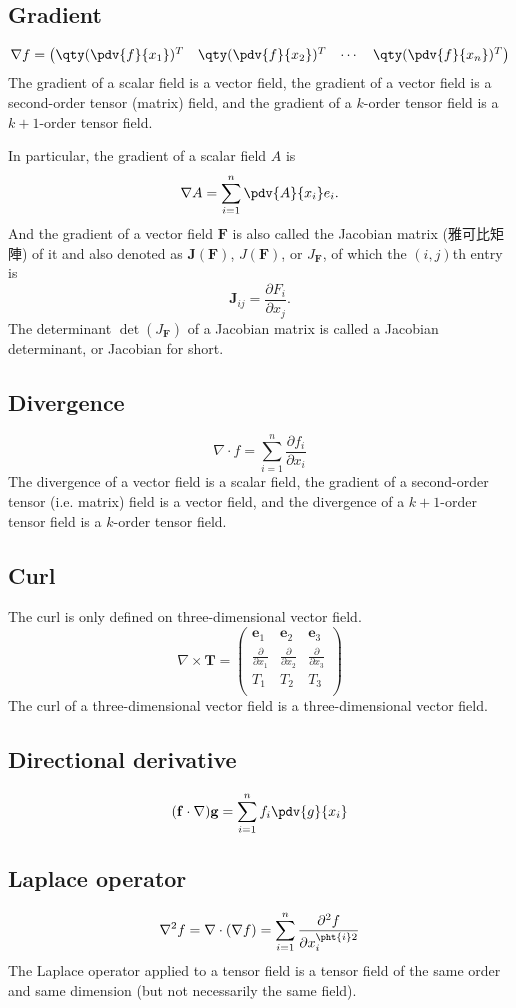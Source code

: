 \documentclass[a4paper,12pt]{report}
\begin{document}
\subsection{Gradient}
\[
\nabla f = \begin{pmatrix}\qty(\pdv{f}{x_1})^T & \qty(\pdv{f}{x_2})^T & \cdots & \qty(\pdv{f}{x_n})^T\end{pmatrix}
\]
The gradient of a scalar field is a vector field, the gradient of a vector field is a second-order tensor (matrix) field, and the gradient of a $k$-order tensor field is a $k+1$-order tensor field. 

In particular, the gradient of a scalar field $A$ is
\[
\nabla A = \sum_{i=1}^n \pdv{A}{x_i}e_i.
\]
And the gradient of a vector field $\mathbf{F}$ is also called the Jacobian matrix (雅可比矩陣) of it and also denoted as $\mathbf{J}(\mathbf{F})$, $J(\mathbf{F})$, or $J_{\mathbf{F}}$, of which the $( i,j )$th entry is
\[\mathbf{J}_{ij}=\frac{\partial F_i}{\partial x_j}.\]
The determinant $\det\left(J_{\mathbf{F}}\right)$ of a Jacobian matrix is called a Jacobian determinant, or Jacobian for short.
\subsection{Divergence}
\[
\nabla \cdot f = \sum_{i=1}^n\frac{\partial f_i}{\partial x_i}
\]
The divergence of a vector field is a scalar field, the gradient of a second-order tensor (i.e. matrix) field is a vector field, and the divergence of a $k+1$-order tensor field is a $k$-order tensor field.
\subsection{Curl}
The curl is only defined on three-dimensional vector field.
\[
\nabla \times \mathbf{T} = 
\begin{pmatrix}
\mathbf{e}_1 & \mathbf{e}_2 & \mathbf{e}_3 \\
\frac{\partial}{\partial x_1} & \frac{\partial}{\partial x_2} & \frac{\partial}{\partial x_3} \\
T_1 & T_2 & T_3 \\
\end{pmatrix}
\]
The curl of a three-dimensional vector field is a three-dimensional vector field.
\subsection{Directional derivative}
\[(\mathbf{f}\cdot\nabla)\mathbf{g}=\sum_{i=1}^n f_i\pdv{g}{x_i}\]
\subsection{Laplace operator}
\[
\nabla^2 f = \nabla \cdot (\nabla f) = \sum_{i=1}^n\frac{\partial^2 f}{\partial x_i^{\pht{i}2}}
\]
The Laplace operator applied to a tensor field is a tensor field of the same order and same dimension (but not necessarily the same field).
\end{document}
